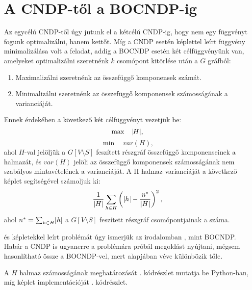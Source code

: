 \section{A CNDP-től a BOCNDP-ig}

Az egycélú CNDP-től úgy jutunk el a kétcélú CNDP-ig, hogy nem egy függvényt fogunk optimalizálni, hanem kettőt.
Míg a CNDP esetén  képlettel leírt függvény minimalizálása volt a feladat,
addig a BOCNDP esetén két célfüggvényünk van, amelyeket optimalizálni szeretnénk $k$ csomópont kitörlése után a $G$ gráfból:
\begin{enumerate}
  \item Maximalizálni szeretnénk az összefüggő komponensek számát.
  \item Minimalizálni szeretnénk az összefüggő komponensek számosságának a varianciáját.
\end{enumerate}
Ennek érdekében a következő két célfüggvényt vezetjük be:
\begin{equation}\label{eqn:MAX_CONNECTED_COMPONENTS}
  \max \quad \lvert H\rvert,
\end{equation}
\begin{equation}\label{eqn:CARDINALITY_VARIANCE_COMPONENTS}
  \min \quad var(H),
\end{equation}
ahol $H$-val jelöljük a $G\left[ V \setminus S \right]$ feszített részgráf összefüggő komponenseinek a halmazát,
és $var(H)$ jelöli az összefüggő komponensek számosságának nem szabályos mintavételének a varianciáját.
A H halmaz varianciáját a következő képlet segítségével számoljuk ki:
\begin{equation}\label{eqn:CARDINALITY_VARIANCE_COMPONENTS}
  \dfrac{1}{ \lvert H\rvert } \sum_{h \in H} \left( \lvert h\rvert - \dfrac{ n^{*} }{ \lvert H\rvert } \right)^{2},
\end{equation}
ahol $n^{*} = \sum_{h \in H} \lvert h\rvert$ a $G\left[ V \setminus S \right]$ feszített részgráf csomópontjainak a száma.

 és 
képletekkel leírt problémát úgy ismerjük az irodalomban \cite{ventresca2018bi}, mint BOCNDP.
Habár a CNDP is ugyanerre a problémára próbál megoldást nyújtani,
mégsem hasonlítható össze a BOCNDP-vel, mert alapjában véve különbözik tőle.

A $H$ halmaz számosságának meghatározását . kódrészlet mutatja be Python-ban,
míg  képlet implementációját . kódrészlet.


